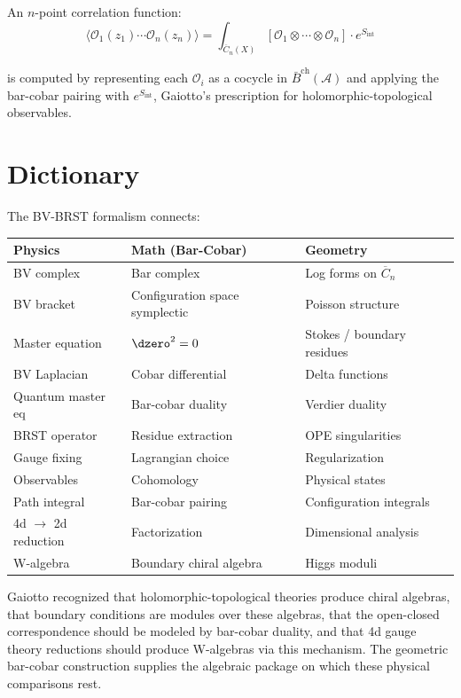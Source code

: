 \begin{example}
An $n$-point correlation function:
\[\langle \mathcal{O}_1(z_1) \cdots \mathcal{O}_n(z_n) \rangle =
\int_{\overline{C}_n(X)} [\mathcal{O}_1 \otimes \cdots \otimes \mathcal{O}_n]
\cdot e^{S_{\text{int}}}\]

is computed by representing each $\mathcal{O}_i$ as a cocycle in $\bar{B}^{\text{ch}}(\mathcal{A})$ and applying the bar-cobar pairing with $e^{S_{\text{int}}}$, Gaiotto's prescription for holomorphic-topological observables.
\end{example}

\section{Dictionary}

\begin{remark}[Dictionary]
The BV-BRST formalism connects:

\begin{center}
\begin{tabular}{|l|l|l|}
\hline
\textbf{Physics} & \textbf{Math (Bar-Cobar)} & \textbf{Geometry} \\
\hline
BV complex & Bar complex & Log forms on $\overline{C}_n$ \\
BV bracket & Configuration space symplectic & Poisson structure \\
Master equation & $\dzero^2 = 0$ & Stokes / boundary residues \\
BV Laplacian & Cobar differential & Delta functions \\
Quantum master eq & Bar-cobar duality & Verdier duality \\
BRST operator & Residue extraction & OPE singularities \\
Gauge fixing & Lagrangian choice & Regularization \\
Observables & Cohomology & Physical states \\
Path integral & Bar-cobar pairing & Configuration integrals \\
4d $\to$ 2d reduction & Factorization & Dimensional analysis \\
W-algebra & Boundary chiral algebra & Higgs moduli \\
\hline
\end{tabular}
\end{center}
\end{remark}

\begin{remark}
Gaiotto recognized that holomorphic-topological theories produce chiral algebras, that boundary conditions are modules over these algebras, that the open-closed correspondence should be modeled by bar-cobar duality, and that 4d gauge theory reductions should produce W-algebras via this mechanism. The geometric bar-cobar construction supplies the algebraic package on which these physical comparisons rest.
\end{remark}

